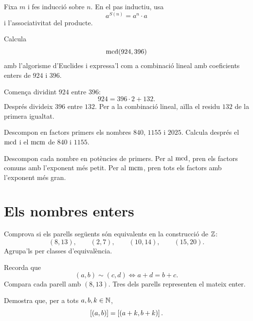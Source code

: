 \begin{indicacio}
Fixa \(m\) i fes inducció sobre \(n\). En el pas inductiu, usa
\[
a^{S(n)}=a^n\cdot a
\]
i l'associativitat del producte.
\end{indicacio}


\begin{exercici}
Calcula
\[
\operatorname{mcd}(924,396)
\]
amb l'algorisme d'Euclides i expressa'l com a combinació lineal amb coeficients enters de \(924\) i \(396\).
\end{exercici}

\begin{indicacio}
Comença dividint \(924\) entre \(396\):
\[
924=396\cdot2+132.
\]
Després divideix \(396\) entre \(132\). Per a la combinació lineal, aïlla el residu \(132\) de la primera igualtat.
\end{indicacio}


\begin{exercici}
Descompon en factors primers els nombres \(840\), \(1155\) i \(2025\). Calcula després el \(\operatorname{mcd}\) i el \(\operatorname{mcm}\) de \(840\) i \(1155\).
\end{exercici}

\begin{indicacio}
Descompon cada nombre en potències de primers. Per al \(\operatorname{mcd}\), pren els factors comuns amb l'exponent més petit. Per al \(\operatorname{mcm}\), pren tots els factors amb l'exponent més gran.
\end{indicacio}


\section{Els nombres enters}

\begin{exercici}
Comprova si els parells següents són equivalents en la construcció de \(\mathbb{Z}\):
\[
(8,13),\qquad (2,7),\qquad (10,14),\qquad (15,20).
\]
Agrupa'ls per classes d'equivalència.
\end{exercici}

\begin{indicacio}
Recorda que
\[
(a,b)\sim(c,d)\iff a+d=b+c.
\]
Compara cada parell amb \((8,13)\). Tres dels parells representen el mateix enter.
\end{indicacio}


\begin{exercici}
Demostra que, per a tots \(a,b,k\in\mathbb{N}\),
\[
\left[(a,b)\right]=\left[(a+k,b+k)\right].
\]
\end{exercici}

